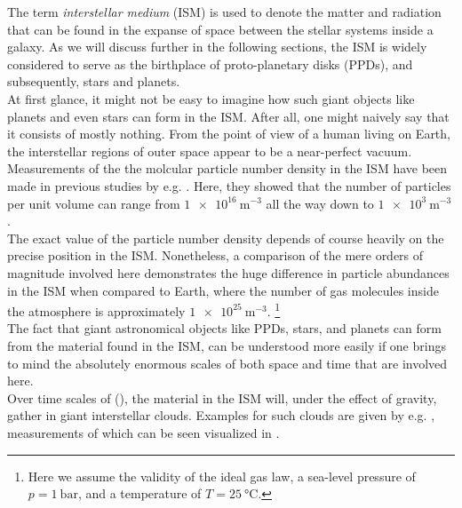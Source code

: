     The term \textit{interstellar medium} (ISM) is used to denote the matter and radiation that 
    can be found in the expanse of space between the stellar systems inside a galaxy. 
    As we will discuss further in the following sections, the ISM is widely considered to serve 
    as the birthplace of proto-planetary disks (PPDs), and subsequently, stars and planets. \\

    At first glance, it might not be easy to imagine how such giant objects like planets and 
    even stars can form in the ISM. After all, one might naively say that it consists of mostly
    nothing. From the point of view of a human living on Earth, the interstellar regions of
    outer space appear to be a near-perfect vacuum. \\

    Measurements of the the molcular particle number density in the ISM have been made in 
    previous studies by e.g. \cite{burton_2013}. Here, they showed that the number of particles 
    per unit volume can range from $\SI{1e16}{\meter^{-3}}$ all the way down to 
    $\SI{1e3}{\meter^{-3}}$. \\

    The exact value of the particle number density depends of course heavily on the precise 
    position in the ISM. Nonetheless, a comparison of the mere orders of magnitude involved 
    here demonstrates the huge difference in particle abundances in the ISM when compared to 
    Earth, where the number of gas molecules inside the atmosphere is approximately 
    $\SI{1e25}{\meter^{-3}}$.
    \footnote{Here we assume the validity of the ideal gas law, a sea-level pressure of 
              $p=\SI{1}{\bar}$, and a temperature of $T=\SI{25}{\celsius}$.}
    \\

    The fact that giant astronomical objects like PPDs, stars, and planets can form from the 
    material found in the ISM, can be understood more easily if one brings to mind the
    absolutely enormous scales of both space and time that are involved here. \\

    Over time scales of (), the material in the ISM 
    will, under the effect of gravity, gather in giant interstellar clouds. Examples for such 
    clouds are given by e.g. , measurements of which can be seen 
    visualized in . \\

